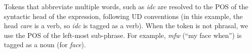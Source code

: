 \documentclass[11pt,a4paper]{article}
\newcommand{\heart}{\ensuremath\heartsuit}
\begin{document}

Tokens that abbreviate multiple words, such as \emph{idc} are resolved to the POS of the syntactic head of the
expression, following UD conventions (in this example, the head \emph{care} is
a verb, so \emph{idc} is tagged as a verb).
When the token is not phrasal, we use the POS of the left-most
sub-phrase.  For example, \emph{mfw} (``my face when'') is tagged as a
noun (for \emph{face}).  %

\end{document}
